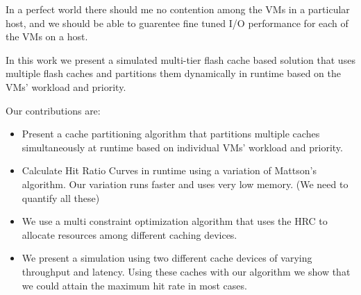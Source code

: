 In a perfect world there should me no contention among the VMs in a particular host, and we should be able to guarentee fine tuned I/O performance for each of the VMs on a host.

In this work we present a simulated multi-tier flash cache based solution that uses multiple flash caches and partitions them dynamically in runtime based on the VMs' workload and priority.

Our contributions are:
\begin{itemize}
\item Present a cache partitioning algorithm that partitions multiple caches simultaneously at runtime based on individual VMs' workload and priority.
\item Calculate Hit Ratio Curves in runtime using a variation of Mattson's algorithm. Our variation runs faster and uses very low memory. (We need to quantify all these)
\item We use a multi constraint optimization algorithm that uses the HRC to allocate resources among different caching devices.
\item We present a simulation using two different cache devices of varying throughput and latency. Using these caches with our algorithm we show that we could attain the maximum hit rate in most cases.
\end{itemize}
